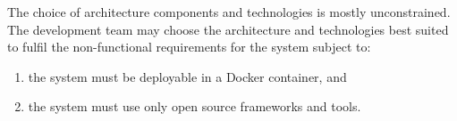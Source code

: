 The choice of architecture components and technologies is mostly unconstrained. The development team may choose the architecture and technologies best suited to fulfil the non-functional requirements for the system subject to:
\begin{enumerate}
	\item the system must be deployable in a Docker container, and
	\item the system must use only open source frameworks and tools.
\end{enumerate}
